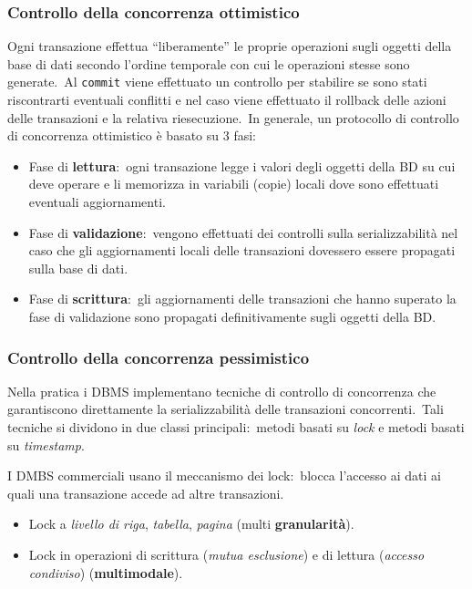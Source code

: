\subsubsection{Controllo della concorrenza ottimistico}

Ogni transazione effettua ``liberamente'' le proprie operazioni sugli oggetti della base di dati secondo l'ordine temporale con cui le operazioni stesse sono generate.\
Al \texttt{commit} viene effettuato un controllo per stabilire se sono stati riscontrarti eventuali conflitti e nel caso viene effettuato il rollback delle azioni delle transazioni e la relativa riesecuzione.\
In generale, un protocollo di controllo di concorrenza ottimistico è basato su 3 fasi:

\begin{itemize}
	\item Fase di \textbf{lettura}:\ ogni transazione legge i valori degli oggetti della BD su cui deve operare e li memorizza in variabili (copie) locali dove sono effettuati eventuali aggiornamenti.
	\item Fase di \textbf{validazione}:\ vengono effettuati dei controlli sulla serializzabilità nel caso che gli aggiornamenti locali delle transazioni dovessero essere propagati sulla base di dati.
	\item Fase di \textbf{scrittura}:\ gli aggiornamenti delle transazioni che hanno superato la fase di validazione sono propagati definitivamente sugli oggetti della BD.
\end{itemize}

\subsubsection{Controllo della concorrenza pessimistico}

Nella pratica i DBMS implementano tecniche di controllo di concorrenza che garantiscono direttamente la serializzabilità delle transazioni concorrenti.\
Tali tecniche si dividono in due classi principali:\ metodi basati su \textit{lock} e metodi basati su \textit{timestamp}.\

I DMBS commerciali usano il meccanismo dei lock:\ blocca l'accesso ai dati ai quali una transazione accede ad altre transazioni.
\begin{itemize}
	\item Lock a \textit{livello di riga}, \textit{tabella}, \textit{pagina} (multi \textbf{granularità}).
	\item Lock in operazioni di scrittura (\textit{mutua esclusione}) e di lettura (\textit{accesso condiviso}) (\textbf{multimodale}).
\end{itemize}

